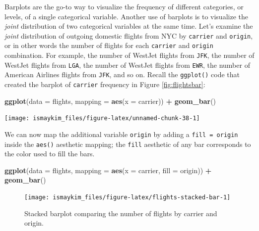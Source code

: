 \documentclass[12pt, krantz2,]{krantz}
\makeatletter
\newenvironment{Shaded}{\begin{snugshade}}{\end{snugshade}}
\newcommand{\DataTypeTok}[1]{\textcolor[rgb]{0.27,0.27,0.27}{#1}}
\newcommand{\KeywordTok}[1]{\textcolor[rgb]{0.27,0.27,0.27}{\textbf{#1}}}
\newcommand{\NormalTok}[1]{#1}
\newcommand{\OperatorTok}[1]{\textcolor[rgb]{0.43,0.43,0.43}{\textbf{#1}}}
\newcommand{\StringTok}[1]{\textcolor[rgb]{0.5,0.5,0.5}{#1}}
\newenvironment{kframe}{%
\medskip{}
\setlength{\fboxsep}{.8em}
 \def\at@end@of@kframe{}%
 \ifinner\ifhmode%
  \def\at@end@of@kframe{\end{minipage}}%
  \begin{minipage}{\columnwidth}%
 \fi\fi%
 \def\FrameCommand##1{\hskip\@totalleftmargin \hskip-\fboxsep
 \colorbox{shadecolor}{##1}\hskip-\fboxsep
     \hskip-\linewidth \hskip-\@totalleftmargin \hskip\columnwidth}%
 \MakeFramed {\advance\hsize-\width
   \@totalleftmargin\z@ \linewidth\hsize
   \@setminipage}}%
 {\par\unskip\endMakeFramed%
 \at@end@of@kframe}
\renewenvironment{Shaded}{\begin{kframe}}{\end{kframe}}
\makeatother
\begin{document}
Barplots are the go-to way to visualize the frequency of different categories, or levels, of a single categorical variable. Another use of barplots is to visualize the \emph{joint} distribution of two categorical variables at the same time. Let's examine the \emph{joint} distribution of outgoing domestic flights from NYC by \texttt{carrier} and \texttt{origin}, or in other words the number of flights for each \texttt{carrier} and \texttt{origin} combination. For example, the number of WestJet flights from \texttt{JFK}, the number of WestJet flights from \texttt{LGA}, the number of WestJet flights from \texttt{EWR}, the number of American Airlines flights from \texttt{JFK}, and so on. Recall the \texttt{ggplot()} code that created the barplot of \texttt{carrier} frequency in Figure \ref{fig:flightsbar}:

\begin{Shaded}
\begin{Highlighting}[]
\KeywordTok{ggplot}\NormalTok{(}\DataTypeTok{data =}\NormalTok{ flights, }\DataTypeTok{mapping =} \KeywordTok{aes}\NormalTok{(}\DataTypeTok{x =}\NormalTok{ carrier)) }\OperatorTok{+}
\StringTok{  }\KeywordTok{geom_bar}\NormalTok{()}
\end{Highlighting}
\end{Shaded}

\begin{center}\texttt{[image: ismaykim\_files/figure-latex/unnamed-chunk-38-1]} \end{center}

We can now map the additional variable \texttt{origin} by adding a \texttt{fill\ =\ origin} inside the \texttt{aes()} aesthetic mapping; the \texttt{fill} aesthetic of any bar corresponds to the color used to fill the bars.

\begin{Shaded}
\begin{Highlighting}[]
\KeywordTok{ggplot}\NormalTok{(}\DataTypeTok{data =}\NormalTok{ flights, }\DataTypeTok{mapping =} \KeywordTok{aes}\NormalTok{(}\DataTypeTok{x =}\NormalTok{ carrier, }\DataTypeTok{fill =}\NormalTok{ origin)) }\OperatorTok{+}
\StringTok{  }\KeywordTok{geom_bar}\NormalTok{()}
\end{Highlighting}
\end{Shaded}

\begin{figure}

{\centering \texttt{[image: ismaykim\_files/figure-latex/flights-stacked-bar-1]} 

}

\caption{Stacked barplot comparing the number of flights by carrier and origin.}\label{fig:flights-stacked-bar}
\end{figure}
\end{document}
